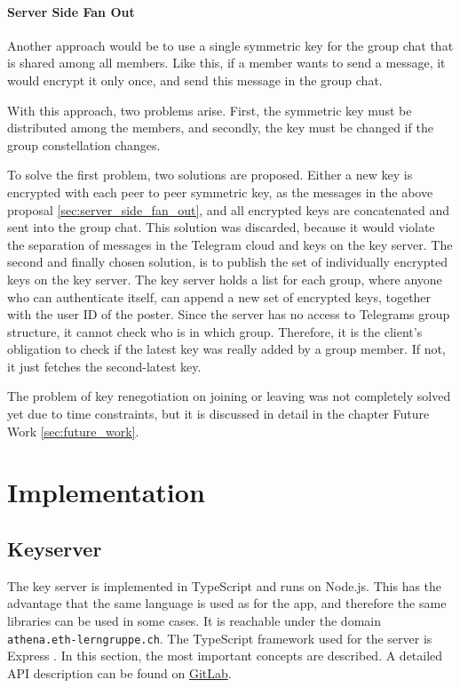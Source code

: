 \documentclass[a4paper, oneside]{discothesis}
\begin{document}
\subsubsection{Server Side Fan Out}

Another approach would be to use a single symmetric key for the group chat that is shared among all members. Like this, if a member wants to send a message, it would encrypt it only once, and send this message in the group chat.

With this approach, two problems arise. First, the symmetric key must be distributed among the members, and secondly, the key must be changed if the group constellation changes.

To solve the first problem, two solutions are proposed. Either a new key is encrypted with each peer to peer symmetric key, as the messages in the above proposal \ref{sec:server_side_fan_out}, and all encrypted keys are concatenated and sent into the group chat. This solution was discarded, because it would violate the separation of messages in the Telegram cloud and keys on the key server. The second and finally chosen solution, is to publish the set of individually encrypted keys on the key server. The key server holds a list for each group, where anyone who can authenticate itself, can append a new set of encrypted keys, together with the user ID of the poster. Since the server has no access to Telegrams group structure, it cannot check who is in which group. Therefore, it is the client's obligation to check if the latest key was really added by a group member. If not, it just fetches the second-latest key.

The problem of key renegotiation on joining or leaving was not completely solved yet due to time constraints, but it is discussed in detail in the chapter Future Work \ref{sec:future_work}.


\chapter{Implementation}




\section{Keyserver}

The key server is implemented in TypeScript and runs on Node.js. This has the advantage that the same language is used as for the app, and therefore the same libraries can be used in some cases. It is reachable under the domain \texttt{athena.eth-lerngruppe.ch}. The TypeScript framework used for the server is Express \cite{Express}. In this section, the most important concepts are described. A detailed API description can be found on  \href{https://gitlab.ethz.ch/disco-students/fs21/zarron_encrypted_chat/-/blob/1.0/Keyserver/API.md}{GitLab}.
\end{document}
